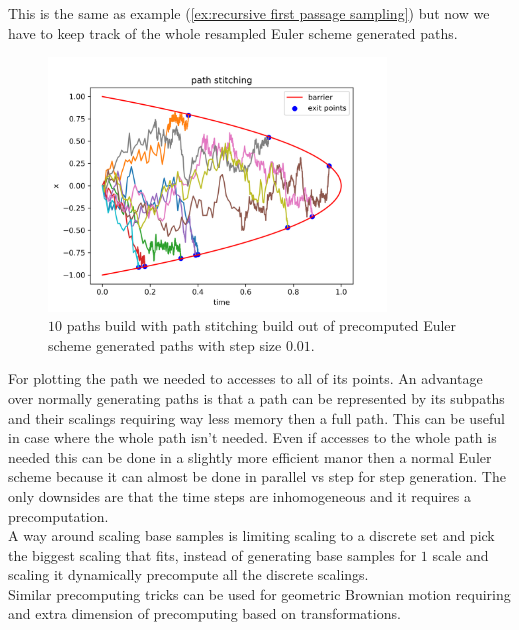 \documentclass[a4paper,12pt]{article}
\begin{document}
\begin{example}
    This is the same as example (\ref{ex:recursive first passage sampling}) but now we have
    to keep track of the whole resampled Euler scheme generated paths.

    \begin{figure}[ht!]
        \centering
        \includegraphics[width=0.8\textwidth]{plots/path stitching para.png}
        \caption{ $10$ paths build with path stitching build out of
            precomputed Euler scheme generated paths with step size $0.01$.}
        \label{fig:path stitching para}
    \end{figure}
\end{example}

For plotting the path we needed to accesses to all of its points.  An advantage
over normally generating paths is that a path can be represented by its subpaths
and their scalings requiring way less memory then a full path. This can be useful
in case where the whole path isn't needed. Even if  accesses to the whole
path is needed this can be done in a slightly more efficient manor
then a normal Euler scheme because it can almost be done in parallel
vs step for step generation. The only downsides are that the time
steps are inhomogeneous and it requires a precomputation. \\

A way around scaling base samples is limiting scaling to a
discrete set and pick the biggest scaling that fits, instead
of generating base samples for $1$ scale and scaling it dynamically
precompute all the discrete scalings. \\

Similar precomputing tricks can be used for geometric Brownian motion
requiring and extra dimension of precomputing based on transformations.
\end{document}
